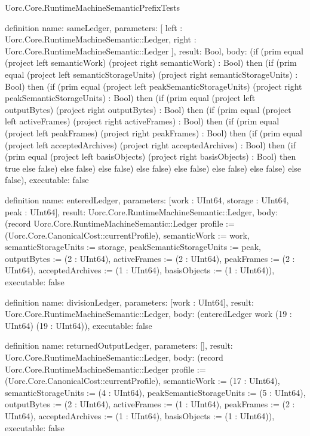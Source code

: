 \begin{lexlean}{Uorc.Core.RuntimeMachineSemanticPrefixTests}
\begin{semanticmodule}
definition{
  name: sameLedger,
  parameters: [
    left : Uorc.Core.RuntimeMachineSemantic::Ledger,
    right : Uorc.Core.RuntimeMachineSemantic::Ledger
  ],
  result: Bool,
  body: (if (prim equal (project left semanticWork) (project right semanticWork) : Bool) then (if (prim equal (project left semanticStorageUnits) (project right semanticStorageUnits) : Bool) then (if (prim equal (project left peakSemanticStorageUnits) (project right peakSemanticStorageUnits) : Bool) then (if (prim equal (project left outputBytes) (project right outputBytes) : Bool) then (if (prim equal (project left activeFrames) (project right activeFrames) : Bool) then (if (prim equal (project left peakFrames) (project right peakFrames) : Bool) then (if (prim equal (project left acceptedArchives) (project right acceptedArchives) : Bool) then (if (prim equal (project left basisObjects) (project right basisObjects) : Bool) then true else false) else false) else false) else false) else false) else false) else false) else false),
  executable: false
}

definition{
  name: enteredLedger,
  parameters: [work : UInt64, storage : UInt64, peak : UInt64],
  result: Uorc.Core.RuntimeMachineSemantic::Ledger,
  body: (record Uorc.Core.RuntimeMachineSemantic::Ledger {profile := (Uorc.Core.CanonicalCost::currentProfile), semanticWork := work, semanticStorageUnits := storage, peakSemanticStorageUnits := peak, outputBytes := (2 : UInt64), activeFrames := (2 : UInt64), peakFrames := (2 : UInt64), acceptedArchives := (1 : UInt64), basisObjects := (1 : UInt64)}),
  executable: false
}

definition{
  name: divisionLedger,
  parameters: [work : UInt64],
  result: Uorc.Core.RuntimeMachineSemantic::Ledger,
  body: (enteredLedger work (19 : UInt64) (19 : UInt64)),
  executable: false
}

definition{
  name: returnedOutputLedger,
  parameters: [],
  result: Uorc.Core.RuntimeMachineSemantic::Ledger,
  body: (record Uorc.Core.RuntimeMachineSemantic::Ledger {profile := (Uorc.Core.CanonicalCost::currentProfile), semanticWork := (17 : UInt64), semanticStorageUnits := (4 : UInt64), peakSemanticStorageUnits := (5 : UInt64), outputBytes := (2 : UInt64), activeFrames := (1 : UInt64), peakFrames := (2 : UInt64), acceptedArchives := (1 : UInt64), basisObjects := (1 : UInt64)}),
  executable: false
}


\end{semanticmodule}
\end{lexlean}

